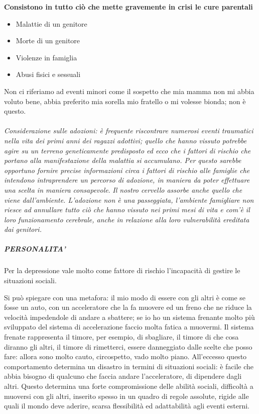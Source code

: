 \textbf{Consistono in tutto ciò che mette gravemente in crisi le cure
parentali}

\begin{itemize}
\item
  Malattie di un genitore
\item
  Morte di un genitore
\item
  Violenze in famiglia
\item
  Abusi fisici e sessuali
\end{itemize}

Non ci riferiamo ad eventi minori come il sospetto che mia mamma non mi
abbia voluto bene, abbia preferito mia sorella mio fratello o mi volesse
bionda; non è questo.
\\\\
\emph{Considerazione sulle adozioni: è frequente riscontrare numerosi
eventi traumatici nella vita dei primi anni dei ragazzi adottivi; quello
che hanno vissuto potrebbe agire su un terreno geneticamente predisposto
ed ecco che i fattori di rischio che portano alla manifestazione della
malattia si accumulano. Per questo sarebbe opportuno fornire precise
informazioni circa i fattori di rischio alle famiglie che intendono
intraprendere un percorso di adozione, in maniera da poter effettuare
una scelta in maniera consapevole}. \emph{Il nostro cervello assorbe
anche quello che viene dall'ambiente. L'adozione non è una passeggiata,
l'ambiente famigliare non riesce ad annullare tutto ciò che hanno
vissuto nei primi mesi di vita e com'è il loro funzionamento cerebrale,
anche in relazione alla loro vulnerabilità ereditata dai genitori.}

\subparagraph{PERSONALITA'}

Per la depressione vale molto come fattore di rischio l'incapacità di
gestire le situazioni sociali.

Si può spiegare con una metafora: il mio modo di essere con gli altri è
come se fosse un auto, con un acceleratore che la fa muovere ed un freno
che ne riduce la velocità impedendole di andare a sbattere; se io ho un
sistema frenante molto più sviluppato del sistema di accelerazione
faccio molta fatica a muovermi. Il sistema frenate rappresenta il
timore, per esempio, di sbagliare, il timore di che cosa diranno gli
altri, il timore di rimetterci, essere danneggiato dalle scelte che
posso fare: allora sono molto cauto, circospetto, vado molto piano.
All'eccesso questo comportamento determina un disastro in termini di
situazioni sociali: è facile che abbia bisogno di qualcuno che faccia
andare l'acceleratore, di dipendere dagli altri. Questo determina una
forte compromissione delle abilità sociali, difficoltà a muoversi con
gli altri, inserito spesso in un quadro di regole assolute, rigide alle
quali il mondo deve aderire, scarsa flessibilità ed adattabilità agli
eventi esterni.

